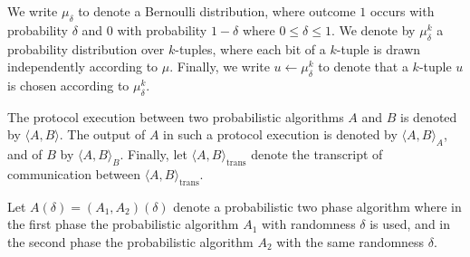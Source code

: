 %
%
\noindent
We write $\mu_{\delta}$ to denote a Bernoulli distribution, where outcome $1$ occurs with probability $\delta$ and $0$ with probability $1-\delta$
where $0 \leq \delta \leq 1$.
We denote by $\mu_{\delta}^k$ a probability distribution over $k$-tuples, where each bit of
a $k$-tuple is drawn independently according to $\mu$.
Finally, we write $u \leftarrow \mu_{\delta}^k$ to denote that a $k$-tuple $u$ is chosen according to $\mu_{\delta}^k$.


The protocol execution between two probabilistic algorithms $A$ and $B$ is denoted by $\langle A, B \rangle$.
The output of $A$ in such a protocol execution is denoted by $\langle A, B \rangle_A$, and of $B$ by $\langle A, B \rangle_B$.
Finally, let $\langle A, B \rangle_{\text{trans}}$ denote the transcript of communication between $\langle A, B \rangle_{\text{trans}}$.

Let $A(\delta) = (A_1, A_2)(\delta)$ denote a probabilistic two phase algorithm
where in the first phase the probabilistic algorithm $A_1$ with randomness $\delta$ is used,
and in the second phase the probabilistic algorithm $A_2$ with the same randomness $\delta$.

